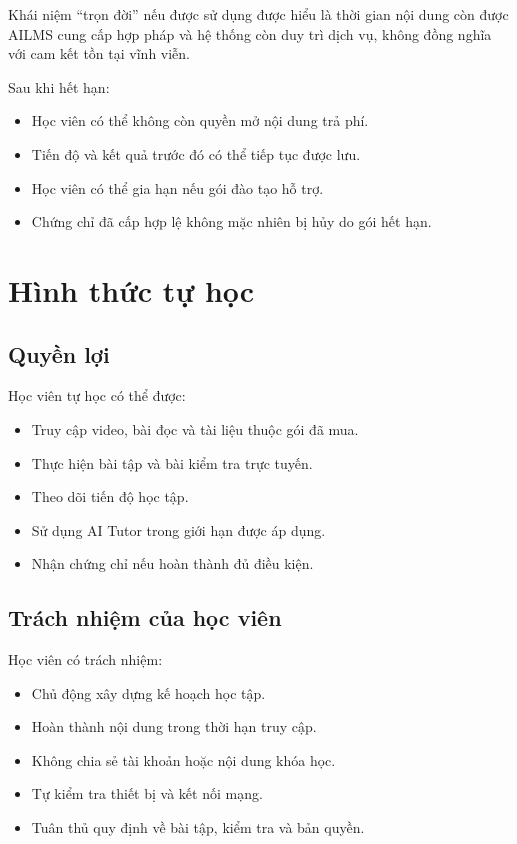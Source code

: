 \documentclass[12pt,a4paper]{article}
\begin{document}
Khái niệm ``trọn đời'' nếu được sử dụng được hiểu là thời gian nội dung
còn được AILMS cung cấp hợp pháp và hệ thống còn duy trì dịch vụ,
không đồng nghĩa với cam kết tồn tại vĩnh viễn.

Sau khi hết hạn:

\begin{itemize}
    \item Học viên có thể không còn quyền mở nội dung trả phí.
    \item Tiến độ và kết quả trước đó có thể tiếp tục được lưu.
    \item Học viên có thể gia hạn nếu gói đào tạo hỗ trợ.
    \item Chứng chỉ đã cấp hợp lệ không mặc nhiên bị hủy do gói hết hạn.
\end{itemize}

\section{Hình thức tự học}

\subsection{Quyền lợi}

Học viên tự học có thể được:

\begin{itemize}
    \item Truy cập video, bài đọc và tài liệu thuộc gói đã mua.
    \item Thực hiện bài tập và bài kiểm tra trực tuyến.
    \item Theo dõi tiến độ học tập.
    \item Sử dụng AI Tutor trong giới hạn được áp dụng.
    \item Nhận chứng chỉ nếu hoàn thành đủ điều kiện.
\end{itemize}

\subsection{Trách nhiệm của học viên}

Học viên có trách nhiệm:

\begin{itemize}
    \item Chủ động xây dựng kế hoạch học tập.
    \item Hoàn thành nội dung trong thời hạn truy cập.
    \item Không chia sẻ tài khoản hoặc nội dung khóa học.
    \item Tự kiểm tra thiết bị và kết nối mạng.
    \item Tuân thủ quy định về bài tập, kiểm tra và bản quyền.
\end{itemize}
\end{document}
